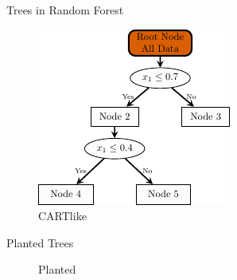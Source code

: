 \documentclass[aspectratio=169,12pt]{beamer}
\begin{document}
\begin{frame}{Trees in Random Forest}
\label{trees-in-random-forest}
\begin{figure}[H]

{\centering \includegraphics[width=\linewidth,height=0.75\textheight,keepaspectratio]{tree-cart.pdf}

}

\caption{CARTlike}

\end{figure}%
\end{frame}

\begin{frame}{Planted Trees}
\label{planted-trees}
\begin{figure}


\caption{\label{fig-planted}Planted}

\end{figure}%
\end{frame}
\end{document}
